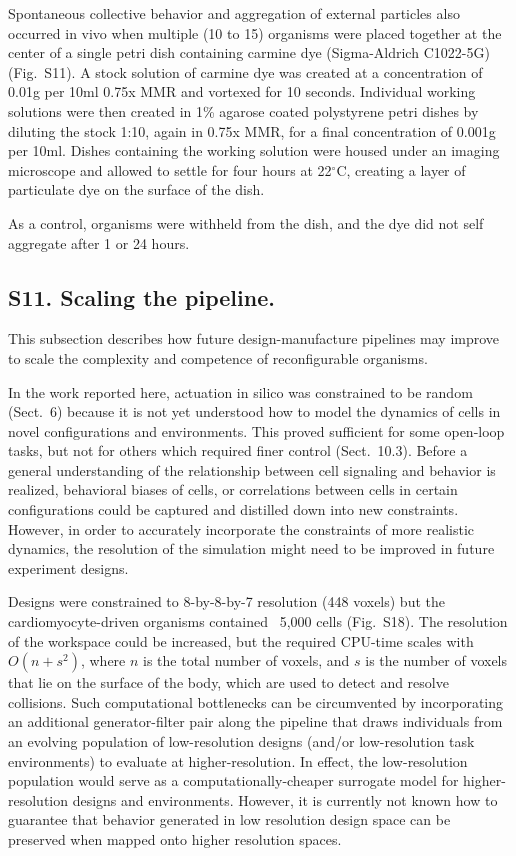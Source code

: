 Spontaneous collective behavior and aggregation of external particles also occurred in vivo when multiple (10 to 15) organisms were placed together at the center of a single petri dish containing carmine dye (Sigma-Aldrich C1022-5G) (Fig.~S11). 
A stock solution of carmine dye was created at a concentration of 0.01g per 10ml 0.75x MMR and vortexed for 10 seconds. 
Individual working solutions were then created in 1\% agarose coated polystyrene petri dishes by diluting the stock 1:10, again in 0.75x MMR, for a final concentration of 0.001g per 10ml. 
Dishes containing the working solution were housed under an imaging microscope and allowed to settle for four hours at 22{$^{\circ}$}C, creating a layer of particulate dye on the surface of the dish.

As a control, organisms were withheld from the dish, and the dye did not self aggregate after 1 or 24 hours. 


\subsection*{S11. Scaling the pipeline.}

This subsection describes how future design-manufacture pipelines may improve to scale the complexity and competence of reconfigurable organisms.

In the work reported here, actuation in silico was constrained to be random (Sect.~6) because it is not yet understood how to model the dynamics of cells in novel configurations and environments. 
This proved sufficient for some open-loop tasks, but not for others which required finer control (Sect.~10.3). 
Before a general understanding of the relationship between cell signaling and behavior is realized, behavioral biases of cells, or correlations between cells in certain configurations could be captured and distilled down into new constraints. 
However, in order to accurately incorporate the constraints of more realistic dynamics, the resolution of the simulation might need to be improved in future experiment designs.


Designs were constrained to 8-by-8-by-7 resolution (448 voxels) but the cardiomyocyte-driven organisms contained ~5,000 cells (Fig.~S18). 
The resolution of the workspace could be increased, but the required CPU-time scales with $O(n+s^2)$, where $n$ is the total number of voxels, and $s$ is the number of voxels that lie on the surface of the body, which are used to detect and resolve collisions. 
Such computational bottlenecks can be circumvented by incorporating an additional generator-filter pair along the pipeline that draws individuals from an evolving population of low-resolution designs (and/or low-resolution task environments) to evaluate at higher-resolution. 
In effect, the low-resolution population would serve as a computationally-cheaper surrogate model for higher-resolution designs and environments. 
However, it is currently not known how to guarantee that behavior generated in low resolution design space can be preserved when mapped onto higher resolution spaces.

